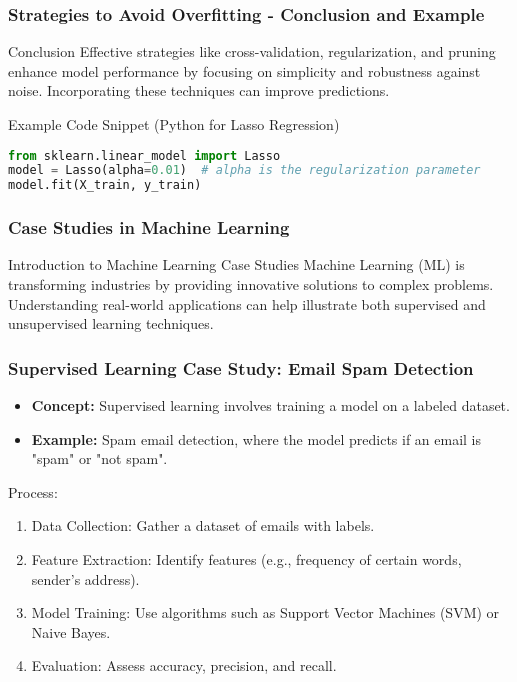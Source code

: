 \documentclass[aspectratio=169]{beamer}
\begin{document}
\begin{frame}[fragile]
    \frametitle{Strategies to Avoid Overfitting - Conclusion and Example}
    \begin{block}{Conclusion}
        Effective strategies like cross-validation, regularization, and pruning enhance model performance by focusing on simplicity and robustness against noise. Incorporating these techniques can improve predictions.
    \end{block}

    \begin{block}{Example Code Snippet (Python for Lasso Regression)}
    \begin{lstlisting}[language=Python]
from sklearn.linear_model import Lasso
model = Lasso(alpha=0.01)  # alpha is the regularization parameter
model.fit(X_train, y_train)
    \end{lstlisting}
    \end{block}
\end{frame}

\begin{frame}[fragile]
    \frametitle{Case Studies in Machine Learning}
    \begin{block}{Introduction to Machine Learning Case Studies}
        Machine Learning (ML) is transforming industries by providing innovative solutions to complex problems. Understanding real-world applications can help illustrate both supervised and unsupervised learning techniques.
    \end{block}
\end{frame}

\begin{frame}[fragile]
    \frametitle{Supervised Learning Case Study: Email Spam Detection}
    \begin{itemize}
        \item \textbf{Concept:} 
            Supervised learning involves training a model on a labeled dataset.
        \item \textbf{Example:} 
            Spam email detection, where the model predicts if an email is "spam" or "not spam".
    \end{itemize}
    
    \begin{block}{Process:}
        \begin{enumerate}
            \item Data Collection: Gather a dataset of emails with labels.
            \item Feature Extraction: Identify features (e.g., frequency of certain words, sender's address).
            \item Model Training: Use algorithms such as Support Vector Machines (SVM) or Naive Bayes.
            \item Evaluation: Assess accuracy, precision, and recall.
        \end{enumerate}
    \end{block}
\end{frame}
\end{document}
